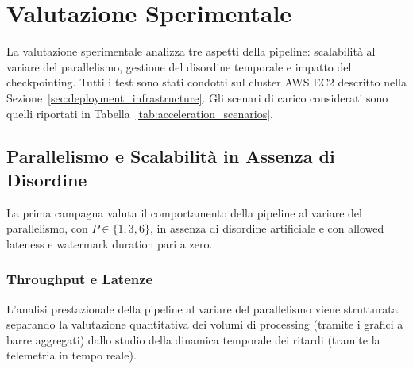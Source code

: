 \documentclass[conference]{IEEEtran}
\begin{document}
\section{Valutazione Sperimentale}\label{sec:experimental_evaluation}

La valutazione sperimentale analizza tre aspetti della pipeline: scalabilità al variare del parallelismo, gestione del disordine temporale e impatto del checkpointing. Tutti i test sono stati condotti sul cluster AWS EC2 descritto nella Sezione~\ref{sec:deployment_infrastructure}. Gli scenari di carico considerati sono quelli riportati in Tabella~\ref{tab:acceleration_scenarios}.

\subsection{Parallelismo e Scalabilità in Assenza di Disordine}\label{subsec:perf_parallelism}

La prima campagna valuta il comportamento della pipeline al variare del parallelismo, con $P \in \{1,3,6\}$, in assenza di disordine artificiale e con allowed lateness e watermark duration pari a zero.

\subsubsection{Throughput e Latenze}\label{subsubsec:throughput_cluster}

L'analisi prestazionale della pipeline al variare del parallelismo viene strutturata separando la valutazione quantitativa dei volumi di processing (tramite i grafici a barre aggregati) dallo studio della dinamica temporale dei ritardi (tramite la telemetria in tempo reale).
\end{document}
